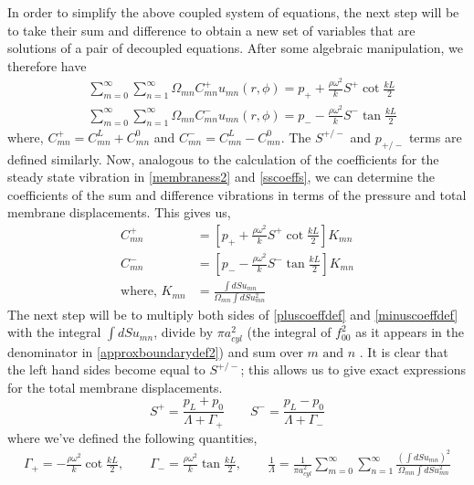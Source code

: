 In order to simplify the above coupled system of equations, the next step will be to take their sum and difference to obtain a new set of 
variables that are solutions of a pair of decoupled equations. After some algebraic manipulation, we therefore have
\begin{align}
 &\displaystyle\sum^\infty_{m=0}\displaystyle\sum^\infty_{n=1}\Omega_{mn}C^{+}_{mn}u_{mn}(r,\phi)=p_{+}+\frac{\rho\omega^2}{k}S^+\cot \frac{kL}{2}\\
 &\displaystyle\sum^\infty_{m=0}\displaystyle\sum^\infty_{n=1}\Omega_{mn}C^{-}_{mn}u_{mn}(r,\phi)=p_{-}-\frac{\rho\omega^2}{k}S^-\tan \frac{kL}{2}
\end{align}
where, $C_{mn}^+=C_{mn}^L+C_{mn}^0$ and $C_{mn}^-=C_{mn}^L-C_{mn}^0$. The $S^{+/-}$ and $p_{+/-}$ terms are defined similarly.
Now, analogous to the calculation of the coefficients for the steady state vibration in \eqref{membraness2} and \eqref{sscoeffs}, we can determine
the coefficients of the sum and difference vibrations in terms of the pressure and total membrane displacements. This gives us,
\begin{align}
 C^{+}_{mn}&=\left[p_{+}+\frac{\rho\omega^2}{k}S^+\cot \frac{kL}{2}\right]K_{mn}\label{pluscoeffdef}\\
 C^{-}_{mn}&=\left[p_{-}-\frac{\rho\omega^2}{k}S^-\tan \frac{kL}{2}\right]K_{mn}\label{minuscoeffdef}\\
 \mbox{where, }K_{mn}&=\frac{\int dS u_{mn}}{\Omega_{mn}\int dS u^2_{mn}}\nonumber
\end{align}
The next step will be to multiply both sides of \eqref{pluscoeffdef} and \eqref{minuscoeffdef} with the integral $\int dS u_{mn}$, 
divide by $\pi a^2_{cyl}$ (the integral of $f^2_{00}$ as it appears in the denominator in \eqref{approxboundarydef2}) and
sum over $m\mbox{ and }n$ . It is clear that the left hand sides become equal to $S^{+/-}$; this allows us to give exact expressions
for the total membrane displacements.
\begin{equation}
 S^{+}=\frac{p_L+p_0}{\Lambda+\Gamma_+}\qquad S^{-}=\frac{p_L-p_0}{\Lambda+\Gamma_-}
\end{equation}
where we've defined the following quantities,
\begin{align}
 \Gamma_+ = -\frac{\rho\omega^2}{k}\cot \frac{kL}{2},\qquad \Gamma_-= \frac{\rho\omega^2}{k}\tan \frac{kL}{2}\nonumber
,\qquad\frac{1}{\Lambda}=\frac{1}{\pi a^2_{cyl}}\displaystyle\sum^\infty_{m=0}\displaystyle\sum^\infty_{n=1}\frac{\left(\int dS u_{mn}\right)^2}{\Omega_{mn}\int dS u^2_{mn}}\nonumber
\end{align}
